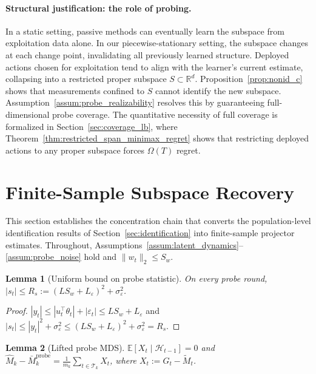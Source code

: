 \documentclass[11pt]{article}
\newcommand{\R}{\mathbb{R}}
\newcommand{\E}{\mathbb{E}}
\newcommand{\cH}{\mathcal{H}}
\newcommand{\cT}{\mathcal{T}}
\newtheorem{lemma}{Lemma}
\begin{document}
\paragraph{Structural justification: the role of probing.}
In a static setting, passive methods can eventually learn the subspace from
exploitation data alone.
In our piecewise-stationary setting, the subspace changes at each change point,
invalidating all previously learned structure.
Deployed actions chosen for exploitation tend to align with the learner's current
estimate, collapsing into a restricted proper subspace $S\subset\R^d$.
Proposition~\ref{prop:nonid_c} shows that measurements confined to $S$ cannot
identify the new subspace.
Assumption~\ref{assum:probe_realizability} resolves this by guaranteeing
full-dimensional probe coverage.
The quantitative necessity of full coverage is formalized in
Section~\ref{sec:coverage_lb}, where
Theorem~\ref{thm:restricted_span_minimax_regret} shows that restricting deployed
actions to any proper subspace forces $\Omega(T)$ regret.


\section{Finite-Sample Subspace Recovery}
\label{sec:concentration}

This section establishes the concentration chain that converts the population-level
identification results of Section~\ref{sec:identification} into finite-sample
projector estimates.
Throughout, Assumptions~\ref{assum:latent_dynamics}--\ref{assum:probe_noise} hold
and $\|w_t\|_2\le S_w$.

\begin{lemma}[Uniform bound on probe statistic]
\label{lem:st_uniform_bound}
On every probe round, $|s_t|\le R_s := (LS_w+L_\varepsilon)^2+\sigma_\varepsilon^2$.
\end{lemma}

\begin{proof}
$|y_t|\le|u_t^\top\theta_t|+|\varepsilon_t|\le LS_w+L_\varepsilon$ and
$|s_t|\le|y_t|^2+\sigma_\varepsilon^2\le(LS_w+L_\varepsilon)^2+\sigma_\varepsilon^2=R_s$.
\end{proof}

\begin{lemma}[Lifted probe MDS]
\label{lem:lifted_mds}
$\E[X_t\mid\cH_{t-1}]=0$ and
$\widehat{M}_k-\bar{M}_k^{\mathrm{probe}}
= \frac{1}{m_k}\sum_{t\in\cT_k}X_t$,
where $X_t := G_t-\widetilde{M}_t$.
\end{lemma}
\end{document}
